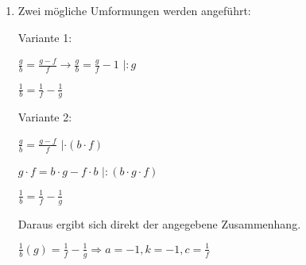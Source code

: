 \begin{langesbeispiel}
{\begin{enumerate}
\item Zwei mögliche Umformungen werden angeführt:

Variante 1:

$\frac{g}{b}=\frac{g-f}{f} \rightarrow \frac{g}{b}=\frac{g}{f}-1$ $|:g$

$\frac{1}{b}=\frac{1}{f}-\frac{1}{g}$

Variante 2:

$\frac{g}{b}=\frac{g-f}{f}$ $|\cdot (b\cdot f)$

$g\cdot f=b\cdot g-f\cdot b$ $|:(b\cdot g\cdot f)$

$\frac{1}{b}=\frac{1}{f}-\frac{1}{g}$

Daraus ergibt sich direkt der angegebene Zusammenhang.

$\frac{1}{b}(g)=\frac{1}{f}-\frac{1}{g}\Rightarrow a=-1,k=-1,c=\frac{1}{f}$
	
			\end{enumerate}}
		\end{langesbeispiel}